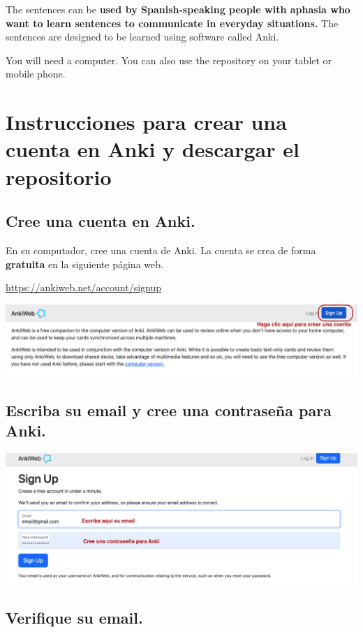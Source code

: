 \documentclass[
]{book}
\begin{document}
The sentences can be \textbf{used by Spanish-speaking people with aphasia who want to learn sentences to communicate in everyday situations.} The sentences are designed to be learned using software called Anki.

You will need a computer. You can also use the repository on your tablet or mobile phone.

\hypertarget{cross_0}{%
\chapter{Instrucciones para crear una cuenta en Anki y descargar el repositorio}\label{cross_0}}

\hypertarget{cree-una-cuenta-en-anki.}{%
\section{Cree una cuenta en Anki.}\label{cree-una-cuenta-en-anki.}}

En su computador, cree una cuenta de Anki. La cuenta se crea de forma \textbf{gratuita} en la siguiente página web.

\url{https://ankiweb.net/account/signup}

\includegraphics[width=0.9\linewidth]{images/reposit_sp/sign_up}

\hypertarget{cross_1}{%
\section{Escriba su email y cree una contraseña para Anki.}\label{cross_1}}

\includegraphics[width=0.9\linewidth]{images/reposit_sp/email_password}

\hypertarget{verifique-su-email.}{%
\section{Verifique su email.}\label{verifique-su-email.}}
\end{document}
